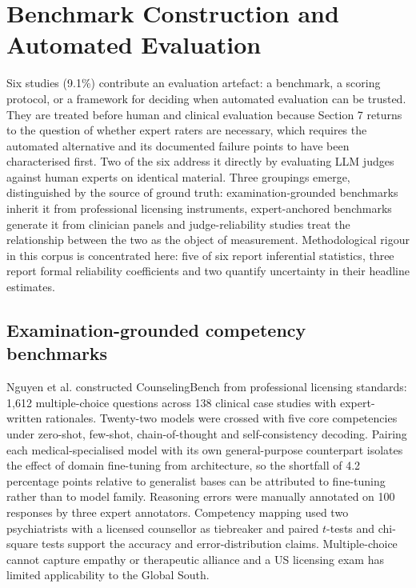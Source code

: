 \documentclass[11pt]{article}
\begin{document}
	\section{Benchmark Construction and Automated Evaluation}
	
	Six studies (9.1\%) contribute an evaluation artefact: a benchmark, a scoring protocol, or a framework for deciding when automated evaluation can be trusted. They are treated before human and clinical evaluation because Section 7 returns to the question of whether expert raters are necessary, which requires the automated alternative and its documented failure points to have been characterised first. Two of the six address it directly by evaluating LLM judges against human experts on identical material. Three groupings emerge, distinguished by the source of ground truth: examination-grounded benchmarks inherit it from professional licensing instruments, expert-anchored benchmarks generate it from clinician panels and judge-reliability studies treat the relationship between the two as the object of measurement. Methodological rigour in this corpus is concentrated here: five of six report inferential statistics, three report formal reliability coefficients and two quantify uncertainty in their headline estimates.
	
	\subsection{Examination-grounded competency benchmarks}
	
	Nguyen et al.\cite{nguyen-etal-2025-large} constructed CounselingBench from professional licensing standards: 1,612 multiple-choice questions across 138 clinical case studies with expert-written rationales. Twenty-two models were crossed with five core competencies under zero-shot, few-shot, chain-of-thought and self-consistency decoding. Pairing each medical-specialised model with its own general-purpose counterpart isolates the effect of domain fine-tuning from architecture, so the shortfall of 4.2 percentage points relative to generalist bases can be attributed to fine-tuning rather than to model family. Reasoning errors were manually annotated on 100 responses by three expert annotators. Competency mapping used two psychiatrists with a licensed counsellor as tiebreaker and paired $t$-tests and chi-square tests support the accuracy and error-distribution claims. Multiple-choice cannot capture empathy or therapeutic alliance and a US licensing exam has limited applicability to the Global South.
	
\end{document}

